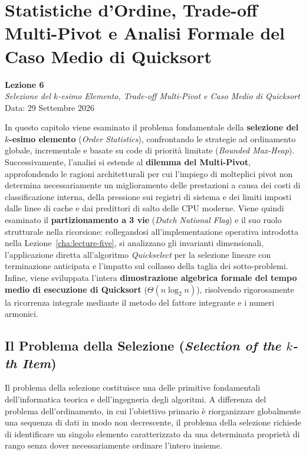 \chapter{Statistiche d'Ordine, Trade-off Multi-Pivot e Analisi Formale del Caso Medio di Quicksort}
\label{cha:lecture-six}

\begin{center}
  \textbf{Lezione 6}\\
  \emph{Selezione del $k$-esimo Elemento, Trade-off Multi-Pivot e Caso Medio di Quicksort}\\[0.5em]
  Data: 29 Settembre 2026
\end{center}

In questo capitolo viene esaminato il problema fondamentale della \textbf{selezione del $k$-esimo elemento} (\textit{Order Statistics}), confrontando le strategie ad ordinamento globale, incrementale e basate su code di priorità limitate (\textit{Bounded Max-Heap}). Successivamente, l'analisi si estende al \textbf{dilemma del Multi-Pivot}, approfondendo le ragioni architetturali per cui l'impiego di molteplici pivot non determina necessariamente un miglioramento delle prestazioni a causa dei costi di classificazione interna, della pressione sui registri di sistema e dei limiti imposti dalle linee di cache e dai predittori di salto delle CPU moderne. Viene quindi esaminato il \textbf{partizionamento a 3 vie} (\textit{Dutch National Flag}) e il suo ruolo strutturale nella ricorsione: collegandosi all'implementazione operativa introdotta nella Lezione~\ref{cha:lecture-five}, si analizzano gli invarianti dimensionali, l'applicazione diretta all'algoritmo \textit{Quickselect} per la selezione lineare con terminazione anticipata e l'impatto sul collasso della taglia dei sotto-problemi. Infine, viene sviluppata l'intera \textbf{dimostrazione algebrica formale del tempo medio di esecuzione di Quicksort} ($\Theta(n \log_2 n)$), risolvendo rigorosamente la ricorrenza integrale mediante il metodo del fattore integrante e i numeri armonici.

\FloatBarrier
\section{Il Problema della Selezione (\textit{Selection of the \texorpdfstring{$k$}{k}-th Item})}
\label{sec:selection-problem}

Il problema della selezione costituisce una delle primitive fondamentali dell'informatica teorica e dell'ingegneria degli algoritmi. A differenza del problema dell'ordinamento, in cui l'obiettivo primario è riorganizzare globalmente una sequenza di dati in modo non decrescente, il problema della selezione richiede di identificare un singolo elemento caratterizzato da una determinata proprietà di rango senza dover necessariamente ordinare l'intero insieme.

